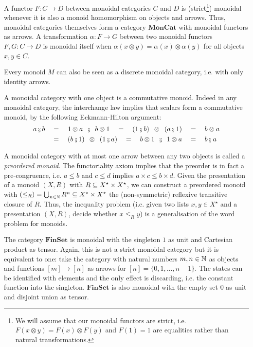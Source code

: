 A functor $F : C \to D$ between monoidal categories $C$ and $D$ is (strict\footnote
{We will assume that our monoidal functors are strict, i.e. $F(x \otimes y) = F(x) \otimes F(y)$ and $F(1) = 1$ are equalities rather than natural transformations.}) monoidal whenever it is also a monoid homomorphism on objects and arrows.
Thus, monoidal categories themselves form a category $\mathbf{MonCat}$ with monoidal functors as arrows.
A transformation $\alpha : F \to G$ between two monoidal functors $F, G : C \to D$ is monoidal itself when $\alpha(x \otimes y) = \alpha(x) \otimes \alpha(y)$ for all objects $x, y \in C$.

\begin{example}
Every monoid $M$ can also be seen as a discrete monoidal category, i.e. with only identity arrows.
\end{example}

\begin{example}
A monoidal category with one object is a commutative monoid.
Indeed in any monoidal category, the interchange law implies that scalars form a commutative monoid, by the following Eckmann-Hilton argument:
\begin{align*}
a \fcmp b
&\quad = \quad 1 \otimes a \s \fcmp \s b \otimes 1
\quad = \quad (1 \fcmp b) \s \otimes \s (a \fcmp 1)
\quad = \quad b \otimes a
\\
&\quad = \quad (b \fcmp 1) \s \otimes \s (1 \fcmp a)
\quad = \quad b \otimes 1 \s \fcmp \s 1 \otimes a
\quad = \quad b \fcmp a
\end{align*}
\end{example}

\begin{example}
A monoidal category with at most one arrow between any two objects is called a \emph{preordered monoid}.
The functoriality axiom implies that the preorder is in fact a pre-congruence, i.e. $a \leq b$ and $c \leq d$ implies $a \times c \leq b \times d$.
Given the presentation of a monoid $(X, R)$ with $R \subseteq X^\star \times X^\star$, we can construct a preordered monoid with $(\leq_R) = \bigcup_{n \in \mathbb{N}} R^n \subseteq X^\star \times X^\star$ the (non-symmetric) reflexive transitive closure of $R$.
Thus, the inequality problem (i.e. given two lists $x, y \in X^\star$ and a presentation $(X, R)$, decide whether $x \leq_R y$) is a generalisation of the word problem for monoids.
\end{example}

\begin{example}
The category $\mathbf{FinSet}$ is monoidal with the singleton $1$ as unit and Cartesian product as tensor.
Again, this is not a strict monoidal category but it is equivalent to one: take the category with natural numbers $m, n \in \mathbb{N}$ as objects and functions $[m] \to [n]$ as arrows for $[n] = \{ 0, 1, \dots, n - 1 \}$.
The states can be identified with elements and the only effect is discarding, i.e. the constant function into the singleton.
$\mathbf{FinSet}$ is also monoidal with the empty set $0$ as unit and disjoint union as tensor.
\end{example}

